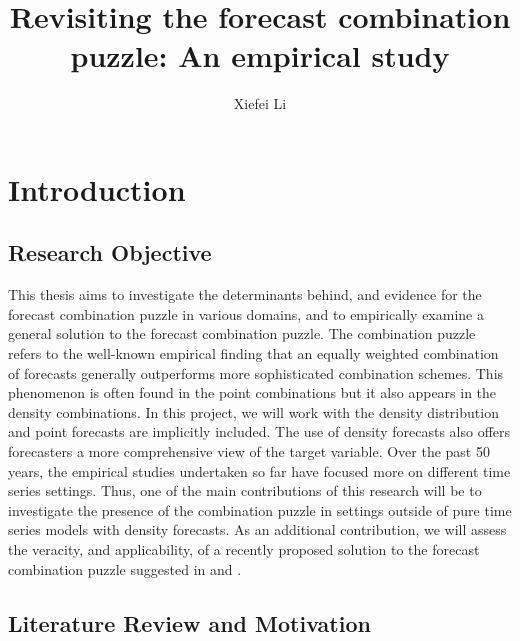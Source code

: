 \documentclass{monashthesis}
\author{Xiefei Li}
\title{Revisiting the forecast combination puzzle: An empirical study}
\begin{document}

\titlepage

{\sf\tighttoc\doublespacing}

\clearpage{}\setcounter{page}{1}

\hypertarget{introduction}{%
\chapter{Introduction}\label{introduction}}

\hypertarget{research-objective}{%
\section{Research Objective}\label{research-objective}}

This thesis aims to investigate the determinants behind, and evidence for the forecast combination puzzle in various domains, and to empirically examine a general solution to the forecast combination puzzle. The combination puzzle refers to the well-known empirical finding that an equally weighted combination of forecasts generally outperforms more sophisticated combination schemes. This phenomenon is often found in the point combinations but it also appears in the density combinations. In this project, we will work with the density distribution and point forecasts are implicitly included. The use of density forecasts also offers forecasters a more comprehensive view of the target variable. Over the past 50 years, the empirical studies undertaken so far have focused more on different time series settings. Thus, one of the main contributions of this research will be to investigate the presence of the combination puzzle in settings outside of pure time series models with density forecasts. As an additional contribution, we will assess the veracity, and applicability, of a recently proposed solution to the forecast combination puzzle suggested in \textcite{ZMFP22} and \textcite{FZMP23}.

\hypertarget{literature-review-and-motivation}{%
\section{Literature Review and Motivation}\label{literature-review-and-motivation}}
\end{document}
